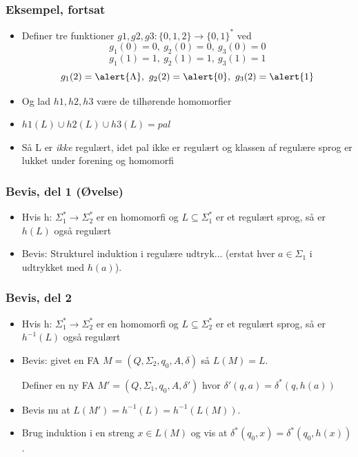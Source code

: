 \documentclass{beamer}
\begin{document}
\begin{frame}
\frametitle{Eksempel, fortsat}
\begin{itemize}[<+->]
\item  Definer tre funktioner  $g1,g2,g3:  \{0,1,2\}\rightarrow\{0,1\}^*$  ved 
\[g_1(0)=0,\ g_2(0)=0,\ g_3(0)=0 \]
\[g_1(1)=1,\ g_2(1)=1,\ g_3(1)=1 \]
\[g_1(2)=\alert{\Lambda},\ g_2(2)=\alert{0},\ g_3(2)=\alert{1} \]
\item  Og lad $h1,h2,h3$ være de tilhørende homomorfier 
\item  $h1(L) \cup h2(L) \cup h3(L) = pal$ 
\item  Så L er \emph{ikke} regulært, idet pal ikke er regulært og klassen  
af regulære sprog er lukket under forening og homomorfi
\end{itemize}
\end{frame}
\begin{frame}
\frametitle{Bevis, del 1 (Øvelse)}
\begin{itemize}[<+->]
\item Hvis h: $\Sigma_1^*\rightarrow\Sigma_2^*$ er en homomorfi og
  $L\subseteq\Sigma_1^*$ er et regulært sprog, så er $h(L)$ også regulært
  \item Bevis: Strukturel induktion i regulære udtryk...
    (erstat hver $a\in\Sigma_1$ i udtrykket med $h(a)$).
\end{itemize}
\end{frame}
\begin{frame}
\frametitle{Bevis, del 2}
\begin{itemize}[<+->]
\item Hvis h: $\Sigma_1^*\rightarrow\Sigma_2^*$ er en homomorfi og
  $L\subseteq\Sigma_2^*$ er et regulært sprog, så er $h^{-1}(L)$ også regulært
  \item Bevis: givet en FA $M=(Q, \Sigma_2, q_0, A, \delta)$ så $L(M)=L$.

    Definer en ny FA $M' = (Q, \Sigma_1, q_0, A, \delta ')$ hvor
    $\delta '(q,a) = \delta^*(q,h(a))$

  \item Bevis nu at $L(M')=h^{-1}(L)=h^{-1}(L(M))$.

  \item Brug induktion i en
    streng $x\in L(M)$ og vis at $\delta^*(q_0,x) =
    \delta^*(q_0,h(x))$.
\end{itemize}
\end{frame}
\end{document}
